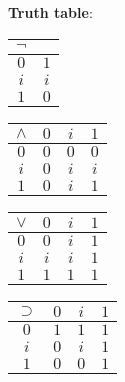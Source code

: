 \documentclass[a4paper]{article}
\begin{document}
\textbf{Truth table}:
\begin{center}
	\renewcommand{\arraystretch}{1.2}
	\begin{tabular}{|c|c|}
		\hline
		$\lnot$ & \\\hline
		$0$ & $1$ \\
		$i$ & $i$ \\
		$1$ & $0$ \\\hline
	\end{tabular}
	\quad
	\begin{tabular}{|c|ccc|}
		\hline
		$\land$ & $0$ & $i$ & $1$ \\\hline
		$0$ & $0$ & $0$ & $0$ \\
		$i$ & $0$ & $i$ & $i$ \\
		$1$ & $0$ & $i$ & $1$ \\\hline
	\end{tabular}
	\quad
	\begin{tabular}{|c|ccc|}
		\hline
		$\lor$ & $0$ & $i$ & $1$ \\\hline
		$0$ & $0$ & $i$ & $1$ \\
		$i$ & $i$ & $i$ & $1$ \\
		$1$ & $1$ & $1$ & $1$ \\\hline
	\end{tabular}
	\quad
	\begin{tabular}{|c|ccc|}
		\hline
		$\supset$ & $0$ & $i$ & $1$ \\\hline
		$0$ & $1$ & $1$ & $1$ \\
		$i$ & $0$ & $i$ & $1$ \\
		$1$ & $0$ & $0$ & $1$ \\\hline
	\end{tabular}
\end{center}

\pagebreak
\end{document}
